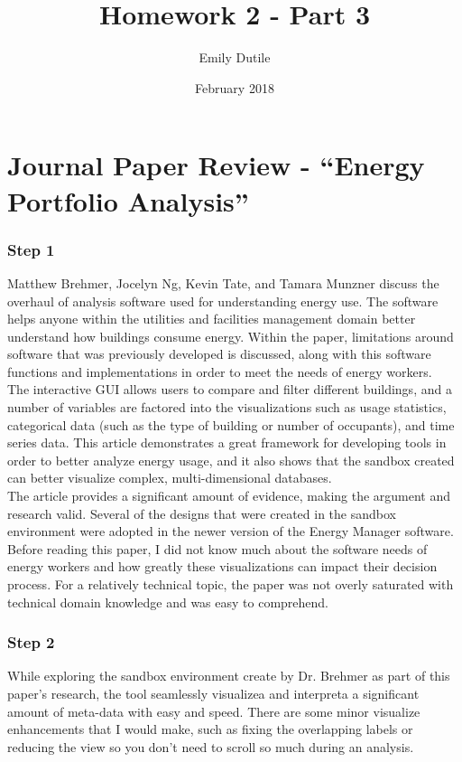\documentclass{neu_handout}
\title{Homework 2 - Part 3}
\author{Emily Dutile}
\date{February 2018}
\begin{document}
\section*{Journal Paper Review - “Energy Portfolio Analysis”}

\subsubsection*{Step 1}
Matthew Brehmer, Jocelyn Ng, Kevin Tate, and Tamara Munzner discuss the overhaul of analysis software used for understanding energy use. The software helps anyone within the utilities and facilities management domain better understand how buildings consume energy. Within the paper, limitations around software that was previously developed is discussed, along with this software functions and implementations in order to meet the needs of energy workers.\\

The interactive GUI allows users to compare and filter different buildings, and a number of variables are factored into the visualizations such as usage statistics, categorical data (such as the type of building or number of occupants), and time series data. This article demonstrates a great framework for developing tools in order to better analyze energy usage, and it also shows that the sandbox created can better visualize complex, multi-dimensional databases.\\

The article provides a significant amount of evidence, making the argument and research valid. Several of the designs that were created in the sandbox environment were adopted in the newer version of the Energy Manager software. Before reading this paper, I did not know much about the software needs of energy workers and how greatly these visualizations can impact their decision process. For a relatively technical topic, the paper was not overly saturated with technical domain knowledge and was easy to comprehend. \\



\subsubsection*{Step 2}
While exploring the sandbox environment create by Dr. Brehmer as part of this paper’s
research, the tool seamlessly visualizea and interpreta a significant amount of meta-data with easy and speed. There are some minor visualize enhancements that I would make, such as fixing the overlapping labels or reducing the view so you don't need to scroll so much during an analysis.
\end{document}
